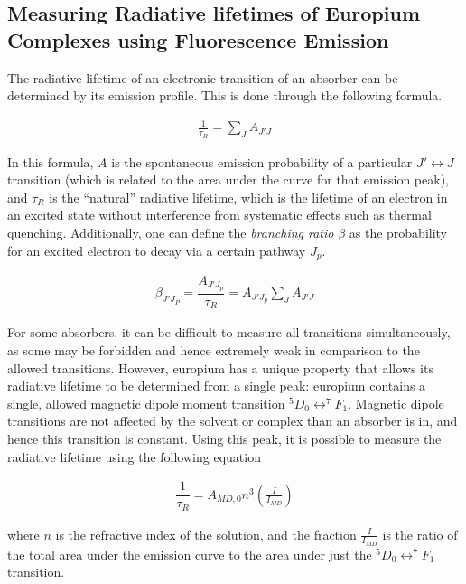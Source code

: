 \subsection{Measuring Radiative lifetimes of Europium Complexes using Fluorescence Emission}

The radiative lifetime of an electronic transition of an absorber can be determined by its emission profile. This is done through the following formula.

\begin{align}
  \frac{1}{\tau_R} = \sum_JA_{J'J}\label{eq:nat_life_emiss}
\end{align}

In this formula, $A$ is the spontaneous emission probability of a particular
$J' \leftrightarrow J$ transition (which is related to the area under the curve for that
emission peak), and $\tau_R$ is the ``natural'' radiative lifetime, which is
the lifetime of an electron in an excited state without interference from
systematic effects such as thermal quenching. Additionally, one can define the
\emph{branching ratio} $\beta$ as the probability for an excited electron to
decay via a certain pathway $J_p$.

\begin{align}
  \beta_{J'J_P} = \dfrac{A_{J'J_p}}{\tau_R} = A_{J'J_p}\sum_J A_{J'J} \label{eq:branch_ratio}
\end{align}

For some absorbers, it can be difficult to measure all transitions
simultaneously, as some may be forbidden and hence extremely weak in
comparison to the allowed transitions. However, europium has a unique property
that allows its radiative lifetime to be determined from a single peak:
europium contains a single, allowed magnetic dipole moment transition $^5D_0
\leftrightarrow ^7F_1$. Magnetic dipole transitions are not affected by the
solvent or complex than an absorber is in, and hence this transition is
constant. Using this peak, it is possible to measure the radiative lifetime
using the following equation

\begin{align}
  \dfrac{1}{\tau_R} = A_{MD,0}n^3\left(\frac{I}{I_{MD}}\right) \label{eq:nat_life_eu}
\end{align}

where $n$ is the refractive index of the solution, and the fraction
$\frac{I}{I_{MD}}$ is the ratio of the total area under the emission curve to
the area under just the $^5D_0 \leftrightarrow ^7F_1$ transition.

